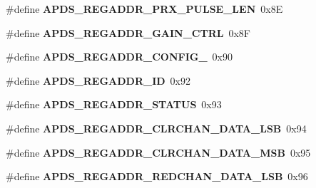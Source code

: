 \begin{DoxyCompactItemize}
\mbox{\label{group__APDS9960__FunctionDefines_gaabb68c4337e3ee29bef61c5bf376077a}} 
\#define {\bfseries A\+P\+D\+S\+\_\+\+R\+E\+G\+A\+D\+D\+R\+\_\+\+P\+R\+X\+\_\+\+P\+U\+L\+S\+E\+\_\+\+L\+EN}~0x8E
\item 
\mbox{\label{group__APDS9960__FunctionDefines_ga2e8f103b5460ca89005e60a9ef075ef3}} 
\#define {\bfseries A\+P\+D\+S\+\_\+\+R\+E\+G\+A\+D\+D\+R\+\_\+\+G\+A\+I\+N\+\_\+\+C\+T\+RL}~0x8F
\item 
\mbox{\label{group__APDS9960__FunctionDefines_ga5e69fcac80055f076c19cbb4e2d11f89}} 
\#define {\bfseries A\+P\+D\+S\+\_\+\+R\+E\+G\+A\+D\+D\+R\+\_\+\+C\+O\+N\+F\+I\+G\+\_}~0x90
\item 
\mbox{\label{group__APDS9960__FunctionDefines_gabf40e98f86bcb279b6e01303bbe421e0}} 
\#define {\bfseries A\+P\+D\+S\+\_\+\+R\+E\+G\+A\+D\+D\+R\+\_\+\+ID}~0x92
\item 
\mbox{\label{group__APDS9960__FunctionDefines_gae6659f797df90b8c4604eb9db40a3d52}} 
\#define {\bfseries A\+P\+D\+S\+\_\+\+R\+E\+G\+A\+D\+D\+R\+\_\+\+S\+T\+A\+T\+US}~0x93
\item 
\mbox{\label{group__APDS9960__FunctionDefines_gaae48bc69c92098d85ccb35dcd21367c5}} 
\#define {\bfseries A\+P\+D\+S\+\_\+\+R\+E\+G\+A\+D\+D\+R\+\_\+\+C\+L\+R\+C\+H\+A\+N\+\_\+\+D\+A\+T\+A\+\_\+\+L\+SB}~0x94
\item 
\mbox{\label{group__APDS9960__FunctionDefines_ga11ab7cf9eb6664ca702548a8b55add89}} 
\#define {\bfseries A\+P\+D\+S\+\_\+\+R\+E\+G\+A\+D\+D\+R\+\_\+\+C\+L\+R\+C\+H\+A\+N\+\_\+\+D\+A\+T\+A\+\_\+\+M\+SB}~0x95
\item 
\mbox{\label{group__APDS9960__FunctionDefines_ga23b9bd391c29bd83ac9789ced094270e}} 
\#define {\bfseries A\+P\+D\+S\+\_\+\+R\+E\+G\+A\+D\+D\+R\+\_\+\+R\+E\+D\+C\+H\+A\+N\+\_\+\+D\+A\+T\+A\+\_\+\+L\+SB}~0x96
\item 
\mbox{\label{group__APDS9960__FunctionDefines_ga114b8205261da903194a68c1e20e2777}} 

\end{DoxyCompactItemize}
